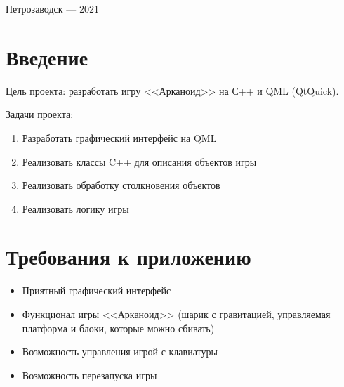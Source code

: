 \documentclass[a4paper,12pt]{article}
\begin{document}
\vfill

\begin{center}
    \large
    Петрозаводск --- 2021
\end{center}



\newpage

\tableofcontents





\newpage
\section*{Введение}

Цель проекта: разработать игру <<Арканоид>> на С++ и QML (QtQuick).

Задачи проекта:
\begin{enumerate}
    \item Разработать графический интерфейс на QML
    \item Реализовать классы C++ для описания объектов игры
    \item Реализовать обработку столкновения объектов
    \item Реализовать логику игры
\end{enumerate}


\section{Требования к приложению}
\begin{itemize}
    \item Приятный графический интерфейс
    \item Функционал игры <<Арканоид>> (шарик с гравитацией, управляемая платформа и блоки, которые можно сбивать)
    \item Возможность управления игрой с клавиатуры
    \item Возможность перезапуска игры
\end{itemize}
\end{document}
